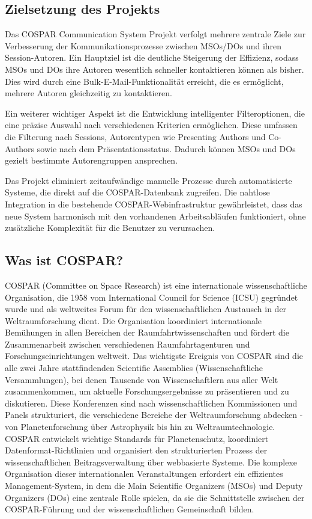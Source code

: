 \documentclass[11pt,a4paper]{article}
\begin{document}
\subsection{Zielsetzung des Projekts}
Das COSPAR Communication System Projekt verfolgt mehrere zentrale Ziele zur Verbesserung der Kommunikationsprozesse zwischen MSOs/DOs und ihren Session-Autoren. Ein Hauptziel ist die deutliche Steigerung der Effizienz, sodass MSOs und DOs ihre Autoren wesentlich schneller kontaktieren können als bisher. Dies wird durch eine Bulk-E-Mail-Funktionalität erreicht, die es ermöglicht, mehrere Autoren gleichzeitig zu kontaktieren.

Ein weiterer wichtiger Aspekt ist die Entwicklung intelligenter Filteroptionen, die eine präzise Auswahl nach verschiedenen Kriterien ermöglichen. Diese umfassen die Filterung nach Sessions, Autorentypen wie Presenting Authors und Co-Authors sowie nach dem Präsentationsstatus. Dadurch können MSOs und DOs gezielt bestimmte Autorengruppen ansprechen.

Das Projekt eliminiert zeitaufwändige manuelle Prozesse durch automatisierte Systeme, die direkt auf die COSPAR-Datenbank zugreifen. Die nahtlose Integration in die bestehende COSPAR-Webinfrastruktur gewährleistet, dass das neue System harmonisch mit den vorhandenen Arbeitsabläufen funktioniert, ohne zusätzliche Komplexität für die Benutzer zu verursachen.

\subsection{Was ist COSPAR?}
COSPAR (Committee on Space Research) ist eine internationale wissenschaftliche Organisation, die 1958 vom International Council for Science (ICSU) gegründet wurde und als weltweites Forum für den wissenschaftlichen Austausch in der Weltraumforschung dient. Die Organisation koordiniert internationale Bemühungen in allen Bereichen der Raumfahrtwissenschaften und fördert die Zusammenarbeit zwischen verschiedenen Raumfahrtagenturen und Forschungseinrichtungen weltweit. Das wichtigste Ereignis von COSPAR sind die alle zwei Jahre stattfindenden Scientific Assemblies (Wissenschaftliche Versammlungen), bei denen Tausende von Wissenschaftlern aus aller Welt zusammenkommen, um aktuelle Forschungsergebnisse zu präsentieren und zu diskutieren. Diese Konferenzen sind nach wissenschaftlichen Kommissionen und Panels strukturiert, die verschiedene Bereiche der Weltraumforschung abdecken - von Planetenforschung über Astrophysik bis hin zu Weltraumtechnologie. COSPAR entwickelt wichtige Standards für Planetenschutz, koordiniert Datenformat-Richtlinien und organisiert den strukturierten Prozess der wissenschaftlichen Beitragsverwaltung über webbasierte Systeme. Die komplexe Organisation dieser internationalen Veranstaltungen erfordert ein effizientes Management-System, in dem die Main Scientific Organizers (MSOs) und Deputy Organizers (DOs) eine zentrale Rolle spielen, da sie die Schnittstelle zwischen der COSPAR-Führung und der wissenschaftlichen Gemeinschaft bilden.
\end{document}
